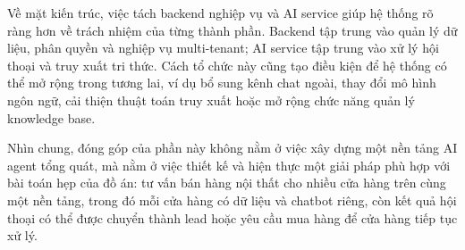 \documentclass[../DoAn.tex]{subfiles}
\begin{document}
Về mặt kiến trúc, việc tách backend nghiệp vụ và AI service giúp hệ thống rõ ràng hơn về trách nhiệm của từng thành phần. Backend tập trung vào quản lý dữ liệu, phân quyền và nghiệp vụ multi-tenant; AI service tập trung vào xử lý hội thoại và truy xuất tri thức. Cách tổ chức này cũng tạo điều kiện để hệ thống có thể mở rộng trong tương lai, ví dụ bổ sung kênh chat ngoài, thay đổi mô hình ngôn ngữ, cải thiện thuật toán truy xuất hoặc mở rộng chức năng quản lý knowledge base.

Nhìn chung, đóng góp của phần này không nằm ở việc xây dựng một nền tảng AI agent tổng quát, mà nằm ở việc thiết kế và hiện thực một giải pháp phù hợp với bài toán hẹp của đồ án: tư vấn bán hàng nội thất cho nhiều cửa hàng trên cùng một nền tảng, trong đó mỗi cửa hàng có dữ liệu và chatbot riêng, còn kết quả hội thoại có thể được chuyển thành lead hoặc yêu cầu mua hàng để cửa hàng tiếp tục xử lý.

\end{document}
